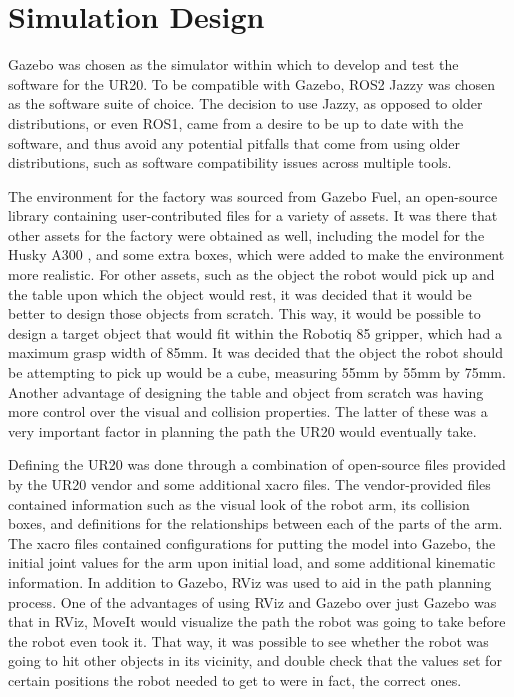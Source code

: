 \documentclass[journal]{new-aiaa}
\begin{document}
\section{Simulation Design}\label{sec:Simulation Design}

Gazebo was chosen as the simulator within which to develop and test the software for the UR20. 
To be compatible with Gazebo, ROS2 Jazzy was chosen as the software suite of choice. 
The decision to use Jazzy, as opposed to older distributions, or even ROS1, came from a desire to be up to date with the software, and thus avoid any potential pitfalls that come from using older distributions, such as software compatibility issues across multiple tools. 

The environment for the factory was sourced from Gazebo Fuel, an open-source library containing user-contributed files for a variety of assets. 
It was there that other assets for the factory \cite{GazeboFuel-ssarkar-industrial-warehouse} were obtained as well, including the model for the Husky A300 \cite{GazeboFuel-OpenRobotics-MARBLE_HUSKY_SENSOR_CONFIG_5}, and some extra boxes, which were added to make the environment more realistic. 
For other assets, such as the object the robot would pick up and the table upon which the object would rest, it was decided that it would be better to design those objects from scratch. 
This way, it would be possible to design a target object that would fit within the Robotiq 85 gripper, which had a maximum grasp width of 85mm. 
It was decided that the object the robot should be attempting to pick up would be a cube, measuring 55mm by 55mm by 75mm. 
Another advantage of designing the table and object from scratch was having more control over the visual and collision properties. 
The latter of these was a very important factor in planning the path the UR20 would eventually take. 

Defining the UR20 was done through a combination of open-source files provided by the UR20 vendor and some additional xacro files. 
The vendor-provided files contained information such as the visual look of the robot arm, its collision boxes, and definitions for the relationships between each of the parts of the arm. 
The xacro files contained configurations for putting the model into Gazebo, the initial joint values for the arm upon initial load, and some additional kinematic information. 
In addition to Gazebo, RViz was used to aid in the path planning process. 
One of the advantages of using RViz and Gazebo over just Gazebo was that in RViz, MoveIt would visualize the path the robot was going to take before the robot even took it. 
That way, it was possible to see whether the robot was going to hit other objects in its vicinity, and double check that the values set for certain positions the robot needed to get to were in fact, the correct ones. 
\end{document}
